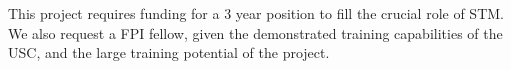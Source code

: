 %
%
%
%
%

This project requires funding for a 3 year position to fill the crucial role of STM. 
%
%    
%
We also request a FPI fellow, given the demonstrated training capabilities of the USC, and the large training potential of the project.